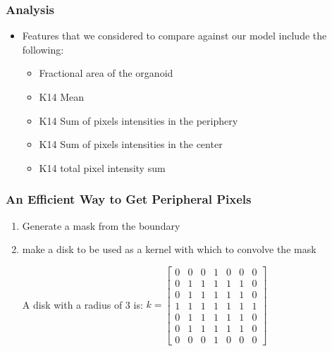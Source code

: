 \documentclass{beamer} %
\begin{document}
\begin{frame}
	\frametitle{Analysis}
	\begin{itemize}
			\item Features that we considered to compare against our model include the following:
			\begin{itemize}
					\item Fractional area of the organoid 
					\item K14 Mean
					\item K14 Sum of pixels intensities in the periphery
					\item K14 Sum of pixels intensities in the center
					\item K14 total pixel intensity sum 
			\end{itemize}
	\end{itemize}
\end{frame}

\begin{frame}
	\frametitle{An Efficient Way to Get Peripheral Pixels}
	\begin{enumerate}
			\item Generate a mask from the boundary
			\item make a disk to be used as a kernel with which to convolve the mask
			\begin{Example}
				A disk with a radius of 3 is:
				\newline
				$k = \begin{bmatrix}
					0 & 0 & 0 & 1 & 0 & 0 & 0 \\
					0 & 1 & 1 & 1 & 1 & 1 & 0 \\
					0 & 1 & 1 & 1 & 1 & 1 & 0 \\
					1 & 1 & 1 & 1 & 1 & 1 & 1 \\
					0 & 1 & 1 & 1 & 1 & 1 & 0 \\
					0 & 1 & 1 & 1 & 1 & 1 & 0 \\
					0 & 0 & 0 & 1 & 0 & 0 & 0
				\end{bmatrix}$
			\end{Example}
	\end{enumerate}
\end{frame}
\end{document}
